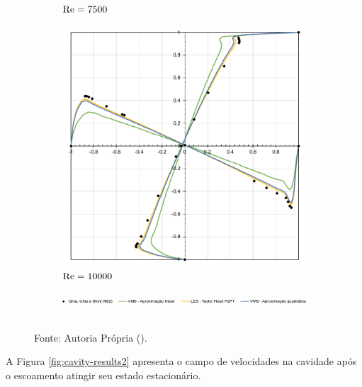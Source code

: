 \begin{figure}[h!]
\begin{subfigure}{0.4\textwidth}
        \caption{$\mathrm{Re}=7500$}
    \end{subfigure}
    \begin{subfigure}{0.4\textwidth}
        \includegraphics[width=\linewidth]{Figuras/Cavity/Re10000.pdf}
        \caption{$\mathrm{Re}=10000$}
    \end{subfigure}
    \begin{subfigure}{\textwidth}
        \includegraphics[width=\linewidth]{Figuras/Cavity/Legenda.pdf}
    \end{subfigure}
    \\Fonte: Autoria Própria (\the\year).
    \label{fig:cavity-results}
\end{figure}

A Figura \ref{fig:cavity-results2} apresenta o campo de velocidades na cavidade após o escoamento atingir seu estado estacionário.

